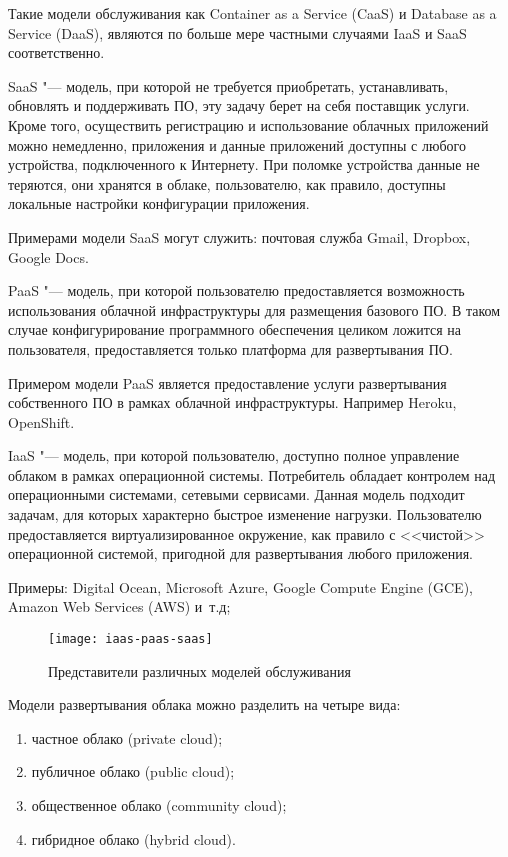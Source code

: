 Такие модели обслуживания как Container as a Service (CaaS) и Database as a Service (DaaS), являются по больше мере частными случаями IaaS и SaaS соответственно.

SaaS "--- модель, при которой не требуется приобретать, устанавливать, обновлять и поддерживать ПО, эту задачу берет на себя поставщик услуги.
Кроме того, осуществить регистрацию и использование облачных приложений можно немедленно, приложения и данные приложений доступны с любого устройства, подключенного к Интернету.
При поломке устройства данные не теряются, они хранятся в облаке, пользователю, как правило, доступны локальные настройки конфигурации приложения.

Примерами модели SaaS могут служить: почтовая служба Gmail, Dropbox, Google Docs.

PaaS "--- модель, при которой пользователю предоставляется возможность использования облачной инфраструктуры для размещения базового ПО.
В таком случае конфигурирование программного обеспечения целиком ложится на пользователя, предоставляется только платформа для развертывания ПО.

Примером модели PaaS является предоставление услуги развертывания собственного ПО в рамках облачной инфраструктуры.
Например Heroku, OpenShift.

IaaS "--- модель, при которой пользователю, доступно полное управление облаком в рамках операционной системы.
Потребитель обладает контролем над операционными системами, сетевыми сервисами.
Данная модель подходит задачам, для которых характерно быстрое изменение нагрузки.
Пользователю предоставляется виртуализированное окружение, как правило с <<чистой>> операционной системой, пригодной для развертывания любого приложения.

Примеры: Digital Ocean, Microsoft Azure, Google Compute Engine (GCE), Amazon Web Services (AWS) и~т.д;

\begin{figure}[ht]
    \centering
	\texttt{[image: iaas-paas-saas]}
	\caption{Представители различных моделей обслуживания}\label{pic:iaas-paas-saas}
\end{figure}

Модели развертывания облака можно разделить на четыре вида:
\begin{enumerate}
    \item частное облако (private cloud);
    \item публичное облако (public cloud);
    \item общественное облако (community cloud);
    \item гибридное облако (hybrid cloud).
\end{enumerate}

